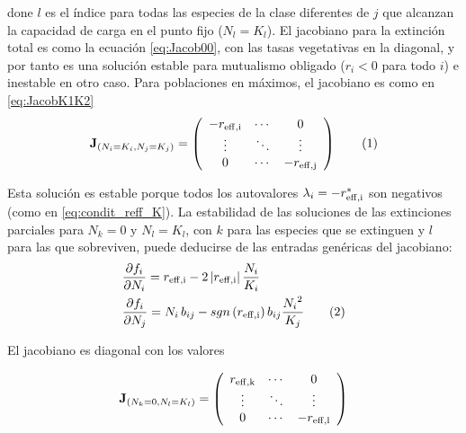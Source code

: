 \noindent done $l$ es el índice para todas las especies de la clase diferentes de $j$ que alcanzan la capacidad de carga en el punto fijo ($N_{l}=K_{l}$). El jacobiano para la extinción total es como la ecuación \ref{eq:Jacob00}, con las tasas vegetativas en la diagonal, y por tanto es una solución estable para mutualismo obligado ($r_i<0$ para todo $i$) e inestable en otro caso. Para poblaciones en máximos, el jacobiano es como en \ref{eq:JacobK1K2}
\begin{equation}
\displaystyle
\mathbf{J}_{\left(N_i=K_i, N_j=K_j\right)}= \left(
  \begin{array}{ccc}
    -r_{\rm{eff},i} & \cdots & 0\\
    \vdots & \ddots & \vdots \\
    0 & \cdots & -r_{\rm{eff},j}
    \end{array} \right)
\stepcounter{equation}\tag{\theequation}\label{eq:GenJacobK1K2}
\end{equation}

Esta solución es estable porque todos los autovalores $\lambda_i=-r_{\rm{eff},i}^{\ast}$ son negativos (como en \ref{eq:condit_reff_K}). La estabilidad de las soluciones de las extinciones parciales para $N_k=0$ y $N_l=K_l$, con $k$ para las especies que se extinguen y $l$ para las que sobreviven, puede deducirse de las entradas genéricas del jacobiano:
\begin{align*}
\displaystyle &\frac{\partial f_i}{\partial N_i} = r_{\rm{eff},i}-2\left|r_{\rm{eff},i}\right| \frac{N_i}{K_i}\\
\displaystyle &\frac{\partial f_i}{\partial N_j} = N_i\,b_{ij}-sgn\left(r_{\rm{eff},i}\right)b_{ij}\frac{{N_i}^2}{K_j}
\stepcounter{equation}\tag{\theequation}\label{eq:partial_ij}
\end{align*}

\noindent El jacobiano es diagonal con los valores

\begin{equation}
\displaystyle
\mathbf{J}_{\left(N_k=0,N_l=K_l\right)}= \left(
  \begin{array}{ccc}
    r_{\rm{eff},k} & \cdots & 0\\
    \vdots & \ddots & \vdots \\
    0 & \cdots & -r_{\rm{eff},l}
    \end{array} \right)
\label{eq:Jacob0_iK_j}
\end{equation}

